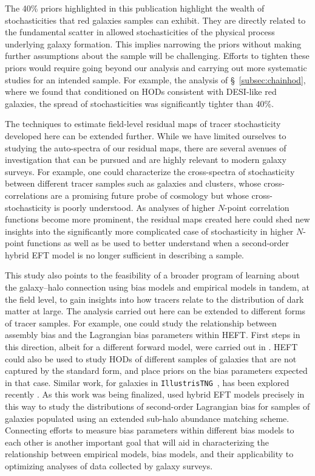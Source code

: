 \documentclass[fleqn,usenatbib]{mnras}
\begin{document}
The 40\% priors highlighted in this publication highlight the wealth of stochasticities that red galaxies samples can exhibit. They are directly related to the fundamental scatter in allowed stochasticities of the physical process underlying galaxy formation. This implies narrowing the priors without making further assumptions about the sample will be challenging. Efforts to tighten these priors would require going beyond our analysis and carrying out more systematic studies for an intended sample. For example, the analysis of \S~\ref{subsec:chainhod}, where we found that conditioned on HODs consistent with DESI-like red galaxies, the spread of stochasticities was significantly tighter than 40\%. \par
The techniques to estimate field-level residual maps of tracer stochasticity developed here can be extended further. While we have limited ourselves to studying the auto-spectra of our residual maps, there are several avenues of investigation that can be pursued and are highly relevant to modern galaxy surveys. For example, one could characterize the cross-spectra of stochasticity between different tracer samples such as galaxies and clusters, whose cross-correlations are a promising future probe of cosmology \citep{To_2021} but whose cross-stochasticity is poorly understood. As analyses of higher $N$-point correlation functions become more prominent, the residual maps created here could shed new insights into the significantly more complicated case of stochasticity in higher $N$-point functions as well as be used to better understand when a second-order hybrid EFT model is no longer sufficient in describing a sample. \par 
This study also points to the feasibility of a broader program of learning about the galaxy--halo connection using bias models and empirical models in tandem, at the field level, to gain insights into how tracers relate to the distribution of dark matter at large. The analysis carried out here can be extended to different forms of tracer samples. For example, one could study the relationship between assembly bias and the Lagrangian bias parameters within HEFT. First steps in this direction, albeit for a different forward model, were carried out in \citet{lazeyras2021assembly}. HEFT could also be used to study HODs of different samples of galaxies that are not captured by the standard \citet{Zheng:2004id} form, and place priors on the bias parameters expected in that case. Similar work, for galaxies in \texttt{IllustrisTNG}~\citep{nelson2021illustristng}, has been explored recently \citep{barreira2021galaxy}. As this work was being finalized, \cite{zennaro2021priors} used hybrid EFT models precisely in this way to study the distributions of second-order Lagrangian bias for samples of galaxies populated using an extended sub-halo abundance matching scheme. Connecting efforts to measure bias parameters within different bias models to each other is another important goal that will aid in characterizing the relationship between empirical models, bias models, and their applicability to optimizing analyses of data collected by galaxy surveys.
\end{document}
